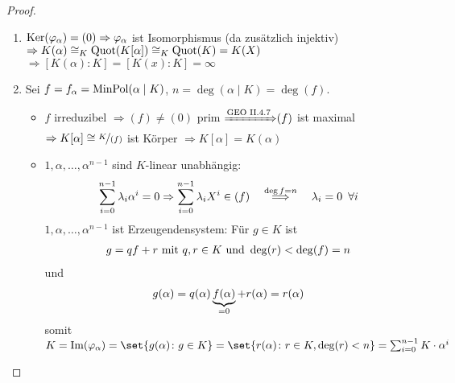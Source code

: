 \begin{proof}
	\begin{enumerate}[label=(\alph*)]
		\item $\operatorname{Ker}(\varphi_\alpha) = (0) \Rightarrow \varphi_\alpha$ ist Isomorphismus (da zusätzlich injektiv) \\
		$\Rightarrow K(\alpha) \cong_K \operatorname{Quot}(K[\alpha]) \cong_K \operatorname{Quot}(K) = K(X)$ \\
		$\Rightarrow [K(\alpha) \colon K] = [K(x) \colon K] = \infty$
		\item Sei $f = f_\alpha = \operatorname{MinPol}(\alpha \mid K)$, $n = \deg(\alpha \mid K) = \deg(f)$.
		\begin{itemize}
			\item $f$ irreduzibel $\Rightarrow (f) \neq (0)$ prim ${\xRightarrow{\text{GEO II.4.7}}} (f)$ ist maximal \\
			$\Rightarrow K[\alpha] \cong \lnkset{K}{(f)}$ ist Körper $\Rightarrow K[\alpha] = K(\alpha)$
			\item $1, \alpha, \dots , \alpha^{n-1}$ sind $K$-linear unabhängig: 
			\begin{align}
			\sum_{i=0}^{n-1} \lambda_i \alpha^i = 0 \Rightarrow \sum_{i=0}^{n-1} \lambda_i X^i \in (f) \quad \overset{\deg f = n}{\Longrightarrow} \quad \lambda_i = 0 \enskip \forall i \notag
			\end{align}
			$1, \alpha, \dots , \alpha^{n-1}$ ist Erzeugendensystem: Für $g \in K$ ist 
			\begin{align}
			g = qf + r \text{ mit } q,r \in K \text{ und } \deg(r) < \deg(f) = n \notag
			\end{align}
			und  
			\begin{align}
			g(\alpha) = q(\alpha) \underbrace{f(\alpha)}_{=0} + r(\alpha) = r(\alpha) \notag
			\end{align}
			somit $K = \Image(\phi_\alpha) = \set{g(\alpha) \colon g \in K} = \set{r(\alpha) \colon r \in K, \deg(r) < n} = \sum_{i=0}^{n-1} K \cdot \alpha^i$
		\end{itemize}
	\end{enumerate}
\end{proof}


